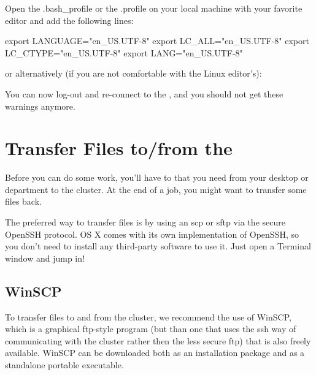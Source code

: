 Open the .bash\_profile or the .profile on your local machine with your
favorite editor and add the following lines:

\begin{prompt}
export LANGUAGE="en_US.UTF-8"
export LC\_ALL="en_US.UTF-8"
export LC\_CTYPE="en_US.UTF-8"
export LANG="en_US.UTF-8"
\end{prompt}

or alternatively (if you are not comfortable with the Linux editor's):

\begin{prompt}
\end{prompt}

You can now log-out and re-connect to the \hpc, and you should not get these warnings anymore.

\section{Transfer Files to/from the \hpc}

Before you can do some work, you'll have to  that
you need from your desktop or department to the cluster. At the end of a job,
you might want to transfer some files back.

The preferred way to transfer files is by using an scp or sftp via the secure
OpenSSH protocol.  OS X comes with its own implementation of OpenSSH, so you
don't need to install any third-party software to use it. Just open a Terminal
window and jump in!

\ifwindows
  \subsection{WinSCP}

  To transfer files to and from the cluster, we recommend the use of WinSCP,
  which is a graphical ftp-style program (but than one that uses the ssh way of
  communicating with the cluster rather then the less secure ftp) that is also
  freely available. WinSCP can be downloaded both as an installation package and
  as a standalone portable executable.

